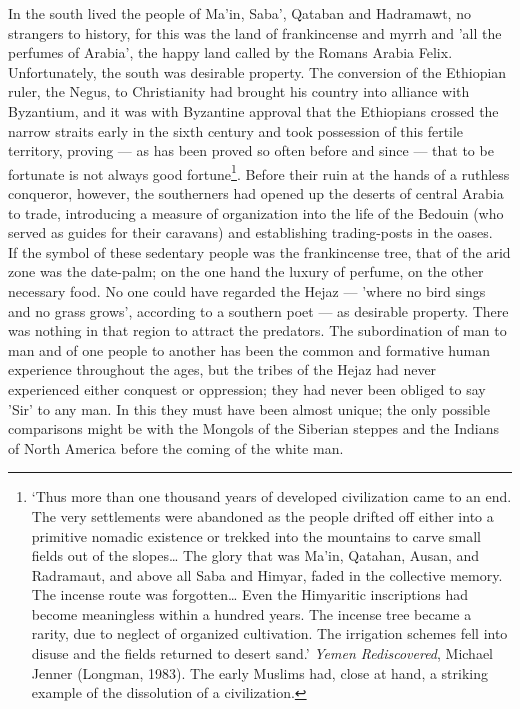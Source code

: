 \documentclass[10pt, twoside,openright]{book}
\begin{document}
In the south lived the people of Ma'in, Saba', Qataban and Hadramawt, no strangers to history, for 
this was the land of frankincense and myrrh and 'all the perfumes of Arabia', the happy land called 
by the Romans Arabia Felix. Unfortunately, the south was desirable property. The conversion of the 
Ethiopian ruler, the Negus, to Christianity had brought his country into alliance with Byzantium, and 
it was with Byzantine approval that the Ethiopians crossed the narrow straits early in the sixth 
century and took possession of this fertile territory, proving --- as has been proved so often before 
and since --- that to be fortunate is not always good fortune\footnote{`Thus more than one thousand years of developed civilization came to an end. The very settlements were abandoned as the people drifted off either into a primitive nomadic existence or trekked into the mountains to carve small fields out of the slopes\ldots{} The glory that was Ma'in, Qatahan, Ausan, and Radramaut, and above all Saba and Himyar, faded in the collective memory. The incense route was forgotten\ldots{} Even the Himyaritic inscriptions had become meaningless within a hundred years. The incense tree became a rarity, due to neglect of organized cultivation. The irrigation schemes fell into disuse and the fields returned to desert sand.' \emph{Yemen Rediscovered}, Michael Jenner (Longman, 1983). The early Muslims had, close at hand, a striking example of the dissolution of a civilization.}. Before their ruin at the hands of a 
ruthless conqueror, however, the southerners had opened up the deserts of central Arabia to trade, 
introducing a measure of organization into the life of the Bedouin (who served as guides for their 
caravans) and establishing trading\hyp{}posts in the oases. \\

If the symbol of these sedentary people was the frankincense tree, that of the arid zone was the 
date\hyp{}palm; on the one hand the luxury of perfume, on the other necessary food. No one could have 
regarded the Hejaz --- 'where no bird sings and no grass grows', according to a southern poet --- as 
desirable property. There was nothing in that region to attract the predators. The subordination of 
man to man and of one people to another has been the common and formative human experience throughout the ages, but the tribes of the Hejaz had never experienced either conquest or oppression; they had never been obliged to say 'Sir' to any man. In this they must have been almost unique; the only 
possible comparisons might be with the Mongols of the Siberian steppes and the Indians of North 
America before the coming of the white man. \\
\end{document}
